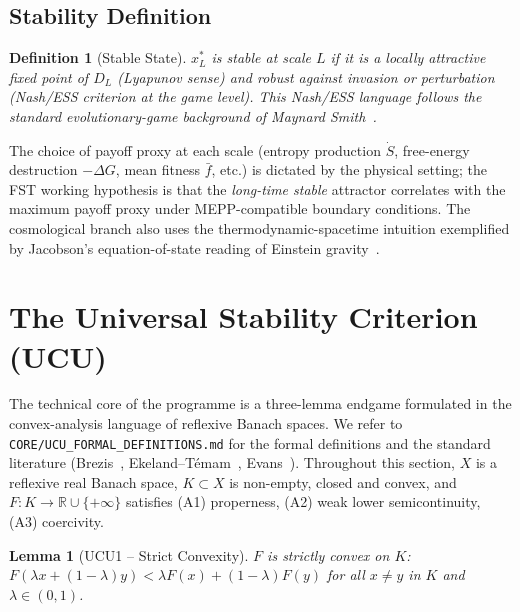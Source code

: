 \documentclass[11pt,a4paper]{article}
\newtheorem{definition}{Definition}
\newtheorem{lemma}{Lemma}
\theoremstyle{remark}
\begin{document}
\subsection{Stability Definition}

\begin{definition}[Stable State]
$x_L^*$ is \emph{stable} at scale $L$ if it is a locally attractive
fixed point of $D_L$ (Lyapunov sense) and robust against invasion
or perturbation (Nash/ESS criterion at the game level).
This Nash/ESS language follows the standard evolutionary-game
background of Maynard Smith~\cite{MaynardSmith1982}.
\end{definition}

The choice of payoff proxy at each scale (entropy production
$\dot S$, free-energy destruction $-\Delta G$, mean fitness $\bar f$,
etc.) is dictated by the physical setting; the FST working hypothesis
is that the \emph{long-time stable} attractor correlates with the
maximum payoff proxy under MEPP-compatible boundary conditions.
The cosmological branch also uses the thermodynamic-spacetime
intuition exemplified by Jacobson's equation-of-state reading of
Einstein gravity~\cite{Jacobson1995}.

\section{The Universal Stability Criterion (UCU)}
\label{sec:ucu}

The technical core of the programme is a three-lemma endgame
formulated in the convex-analysis language of reflexive Banach spaces.
We refer to \texttt{CORE/UCU\_FORMAL\_DEFINITIONS.md}
for the formal definitions and the standard literature
(Brezis~\cite{Brezis2011}, Ekeland--T\'emam~\cite{EkelandTemam1999},
Evans~\cite{Evans2010}). Throughout this section, $X$ is a reflexive
real Banach space, $K \subset X$ is non-empty, closed and convex, and
$F : K \to \mathbb{R} \cup \{+\infty\}$ satisfies (A1) properness,
(A2) weak lower semicontinuity, (A3) coercivity.

\begin{lemma}[UCU1 -- Strict Convexity]
\label{lem:ucu1}
$F$ is \emph{strictly convex} on $K$:
$F(\lambda x + (1{-}\lambda) y) < \lambda F(x) + (1{-}\lambda)F(y)$
for all $x \neq y$ in $K$ and $\lambda \in (0,1)$.
\end{lemma}
\end{document}
